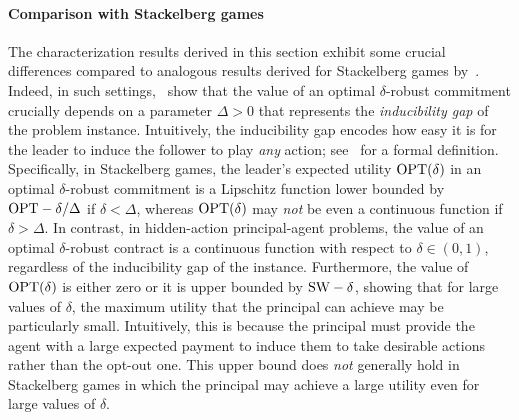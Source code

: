 \paragraph{Comparison with Stackelberg games}
%
The characterization results derived in this section exhibit some crucial differences compared to analogous results derived for Stackelberg games by~\citet{gan2024robust}.
%
Indeed, in such settings, \citet{gan2024robust}~show that the value of an optimal $\delta$-robust commitment crucially depends on a parameter $\Delta > 0$ that represents the \emph{inducibility gap} of the problem instance.
%
Intuitively, the inducibility gap encodes how easy it is for the leader to induce the follower to play \emph{any} action; see~\citep{gan2024robust} for a formal definition.
%
Specifically, in Stackelberg games, the leader's expected utility $\textnormal{OPT}(\delta)$ in an optimal $\delta$-robust commitment is a Lipschitz function lower bounded by $\textnormal{OPT} - \delta / \Delta$ if $\delta < \Delta$, whereas $\textnormal{OPT}(\delta)$ may \emph{not} be even a continuous function if $\delta > \Delta$.
%
In contrast, in hidden-action principal-agent problems, the value of an optimal $\delta$-robust contract is a continuous function with respect to $\delta \in (0,1)$, regardless of the inducibility gap of the instance.
%
Furthermore, the value of $\textnormal{OPT}(\delta)$ is either zero or it is upper bounded by $\textnormal{SW} - \delta$, showing that for large values of $\delta$, the maximum utility that the principal can achieve may be particularly small.
% 
Intuitively, this is because the principal must provide the agent with a large expected payment to induce them to take desirable actions rather than the opt-out one.
%
This upper bound does \emph{not} generally hold in Stackelberg games in which the principal may achieve a large utility even for large values of $\delta$.


